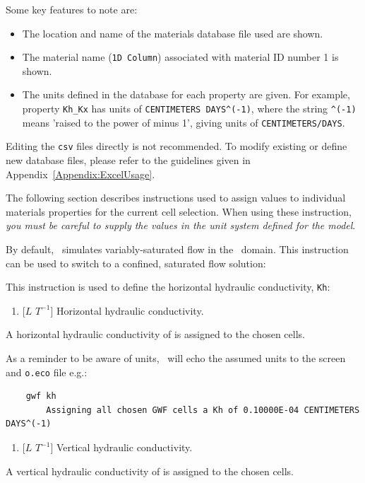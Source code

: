 {\begin{verbatim}
\end{verbatim}
Some key features to note are:
\begin{itemize}
    \item The location and name of the materials database file used are shown.
    \item The material name (\texttt{1D Column}) associated with material ID number 1 is shown.
    \item The units defined in the database for each property are given. For example, property  \texttt{Kh\_Kx} has units of \verb+CENTIMETERS DAYS^(-1)+, where the string \verb+^(-1)+ means 'raised to the power of minus 1', giving units of \verb+CENTIMETERS/DAYS+.
\end{itemize}

Editing the \texttt{csv} files directly is not recommended. To modify existing or define new database files, please refer to the guidelines given in Appendix~\ref{Appendix:ExcelUsage}.

The following section describes instructions used to assign values to individual materials properties for the current cell selection.  When using these instruction, {\em you must be careful to supply the values in the unit system defined for the model}. 

By default, \mfus\ simulates variably-saturated flow in the \gwf\ domain.  This instruction can be used to switch to a confined, saturated flow solution:

{\squish}

This instruction is used to define the horizontal hydraulic conductivity, \texttt{Kh}:

    {
        \squish
        \begin{enumerate}
        \item {} [$L$   $T^{-1}$]  Horizontal hydraulic conductivity.
        \end{enumerate}
          A horizontal hydraulic conductivity of  is assigned to the chosen cells.
    }

As a reminder to be aware of units, \mut\ will echo the assumed units to the screen and \texttt{o.eco} file e.g.:
\begin{verbatim}
    gwf kh
    	Assigning all chosen GWF cells a Kh of 0.10000E-04 CENTIMETERS DAYS^(-1)
\end{verbatim}

    {
        \squish
        \begin{enumerate}
        \item {} [$L$   $T^{-1}$]  Vertical hydraulic conductivity.
        \end{enumerate}
          A vertical hydraulic conductivity of  is assigned to the chosen cells.
    }

}
